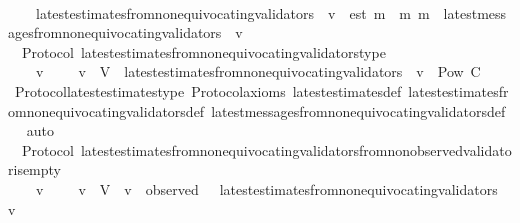 \begin{isabellebody}
\ \ \isanewline
\ \ \ \ {\isachardoublequoteopen}latest{\isacharunderscore}estimates{\isacharunderscore}from{\isacharunderscore}non{\isacharunderscore}equivocating{\isacharunderscore}validators\ {\isasymsigma}\ v\ {\isacharequal}\ {\isacharbraceleft}est\ m\ {\isacharbar}\ m{\isachardot}\ m\ {\isasymin}\ latest{\isacharunderscore}messages{\isacharunderscore}from{\isacharunderscore}non{\isacharunderscore}equivocating{\isacharunderscore}validators\ {\isasymsigma}\ v{\isacharbraceright}{\isachardoublequoteclose}\isanewline
\isanewline
{}\isamarkupfalse%
\ {\isacharparenleft}\ Protocol{\isacharparenright}\ latest{\isacharunderscore}estimates{\isacharunderscore}from{\isacharunderscore}non{\isacharunderscore}equivocating{\isacharunderscore}validators{\isacharunderscore}type\ {\isacharcolon}\isanewline
\ \ {\isachardoublequoteopen}{\isasymforall}\ {\isasymsigma}\ v{\isachardot}\ {\isasymsigma}\ {\isasymin}\ {\isasymSigma}\ {\isasymand}\ v\ {\isasymin}\ V\ {\isasymlongrightarrow}\ latest{\isacharunderscore}estimates{\isacharunderscore}from{\isacharunderscore}non{\isacharunderscore}equivocating{\isacharunderscore}validators\ {\isasymsigma}\ v\ {\isasymin}\ Pow\ C{\isachardoublequoteclose}\isanewline
%
\isadelimproof
\ \ %
\endisadelimproof
%
\isatagproof
{}\isamarkupfalse%
\ Protocol{\isachardot}latest{\isacharunderscore}estimates{\isacharunderscore}type\ Protocol{\isacharunderscore}axioms\ latest{\isacharunderscore}estimates{\isacharunderscore}def\ latest{\isacharunderscore}estimates{\isacharunderscore}from{\isacharunderscore}non{\isacharunderscore}equivocating{\isacharunderscore}validators{\isacharunderscore}def\ latest{\isacharunderscore}messages{\isacharunderscore}from{\isacharunderscore}non{\isacharunderscore}equivocating{\isacharunderscore}validators{\isacharunderscore}def\ \isamarkupfalse%
\ auto%
\endisatagproof
{\isafoldproof}%
%
\isadelimproof
\isanewline
%
\endisadelimproof
\isanewline
{}\isamarkupfalse%
\ {\isacharparenleft}\ Protocol{\isacharparenright}\ latest{\isacharunderscore}estimates{\isacharunderscore}from{\isacharunderscore}non{\isacharunderscore}equivocating{\isacharunderscore}validators{\isacharunderscore}from{\isacharunderscore}non{\isacharunderscore}observed{\isacharunderscore}validator{\isacharunderscore}is{\isacharunderscore}empty\ {\isacharcolon}\isanewline
\ \ {\isachardoublequoteopen}{\isasymforall}\ {\isasymsigma}\ v{\isachardot}\ {\isasymsigma}\ {\isasymin}\ {\isasymSigma}\ {\isasymand}\ v\ {\isasymin}\ V\ {\isasymand}\ v\ {\isasymnotin}\ observed\ {\isasymsigma}\ {\isasymlongrightarrow}\ latest{\isacharunderscore}estimates{\isacharunderscore}from{\isacharunderscore}non{\isacharunderscore}equivocating{\isacharunderscore}validators\ {\isasymsigma}\ v\ {\isacharequal}\ {\isasymemptyset}{\isachardoublequoteclose}\isanewline

\end{isabellebody}
